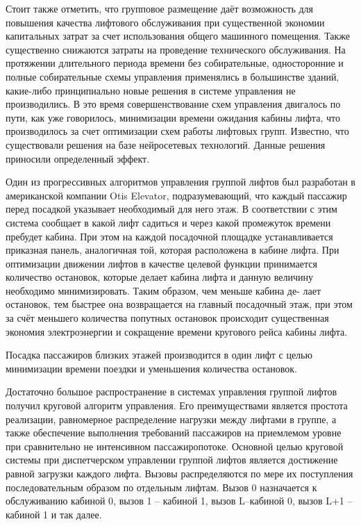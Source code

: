	Стоит также отметить, что групповое размещение даёт возможность для повышения
		качества лифтового обслуживания при существенной экономии капитальных затрат
		за счет использования общего машинного помещения. Также существенно снижаются
		затраты на проведение технического обслуживания. На протяжении длительного периода
		времени без собирательные, односторонние и полные собирательные схемы управления
		применялись в большинстве зданий, какие-либо принципиально новые решения в системе управления не производились.
		В это время совершенствование схем управления двигалось по пути, как уже говорилось,
		минимизации времени ожидания кабины лифта, что производилось за счет оптимизации схем работы лифтовых групп.
		Известно, что существовали решения на базе нейросетевых технологий.
		Данные решения приносили определенный эффект.

	Один из прогрессивных алгоритмов
		управления группой лифтов был разработан в американской компании Otis Elevator,
		подразумевающий, что каждый пассажир перед посадкой указывает необходимый для него этаж.
		В соответствии с этим система сообщает в какой лифт садиться
		и через какой промежуток времени пребудет кабина. При этом на каждой посадочной площадке
		устанавливается приказная панель, аналогичная той, которая расположена в кабине лифта.
		При оптимизации движении лифтов в качестве целевой функции принимается количество остановок,
		которые делает кабина лифта и данную величину необходимо минимизировать.
		Таким образом, чем меньше кабина де- лает остановок, тем быстрее она возвращается
		на главный посадочный этаж, при этом за счёт меньшего количества попутных остановок
		происходит существенная экономия электроэнергии и сокращение времени кругового рейса кабины лифта.

	Посадка пассажиров близких этажей производится в один лифт с целью минимизации времени поездки
		и уменьшения количества остановок.
		
	Достаточно большое распространение в системах управления группой лифтов получил круговой алгоритм управления.
		Его преимуществами является простота реализации, равномерное распределение нагрузки между лифтами в группе,
		а также обеспечение выполнения требований пассажиров на приемлемом уровне
		при сравнительно не интенсивном пассажиропотоке.
		Основной целью круговой системы при диспетчерском управлении группой лифтов является
		достижение равной загрузки каждого лифта. Вызовы распределяются по мере
		их поступления последовательным образом по отдельным лифтам.
		Вызов 0 назначается к обслуживанию кабиной 0, вызов 1 – кабиной 1, вызов L–кабиной 0,
		вызов L+1 – кабиной 1 и так далее.

